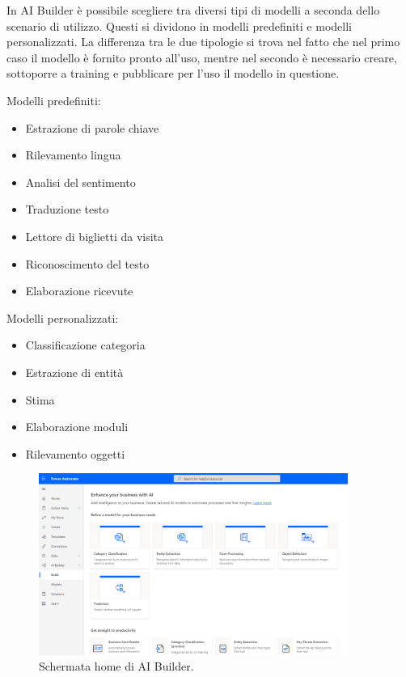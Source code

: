 In AI Builder è possibile scegliere tra diversi tipi di modelli a seconda dello scenario di utilizzo. Questi si dividono in modelli predefiniti e modelli personalizzati.
La differenza tra le due tipologie si trova nel fatto che nel primo caso il modello è fornito pronto all'uso, mentre nel secondo è necessario creare, sottoporre a training e pubblicare per l'uso il modello in questione.

\begin{multicols}{2}
  Modelli predefiniti:
    \begin{itemize}
      \item Estrazione di parole chiave
      \item Rilevamento lingua
      \item Analisi del sentimento
      \item Traduzione testo
      \item Lettore di biglietti da visita
      \item Riconoscimento del testo
      \item Elaborazione ricevute
    \end{itemize}
\columnbreak
  Modelli personalizzati:
    \begin{itemize}
      \item Classificazione categoria
      \item Estrazione di entità
      \item Stima
      \item Elaborazione moduli
      \item Rilevamento oggetti
    \end{itemize}
\end{multicols}

\begin{figure}[ht!]
  \centering
  \includegraphics[width=0.9\textwidth]{ai-builder-home.png}
  \caption{Schermata home di AI Builder.}
  \label{fig:aiBuilderHome}
\end{figure}

